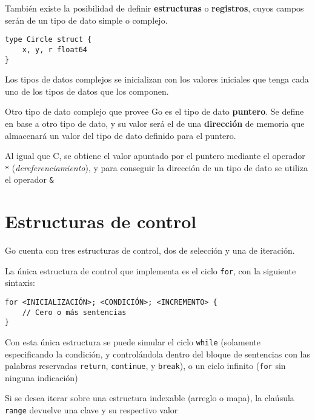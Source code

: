 También existe la posibilidad de definir \textbf{estructuras} o \textbf{registros}, cuyos campos serán de un tipo de dato simple o complejo.

\vspace*{5mm}
\begin{lstlisting}[title=Definición de un tipo de registro \texttt{Circle} con tres campos del mismo tipo]
type Circle struct {
    x, y, r float64
}
\end{lstlisting}

Los tipos de datos complejos se inicializan con los valores iniciales que tenga cada uno de los tipos de datos que los componen.

Otro tipo de dato complejo que provee Go es el tipo de dato \textbf{puntero}. Se define en base a otro tipo de dato, y su valor será el de una \textbf{dirección} de memoria que almacenará un valor del tipo de dato definido para el puntero. 

Al igual que C, se obtiene el valor apuntado por el puntero mediante el operador \texttt{*} (\emph{dereferenciamiento}), y para conseguir la dirección de un tipo de dato se utiliza el operador \texttt{\&} 



\section{Estructuras de control}

Go cuenta con tres estructuras de control, dos de selección y una de iteración.

La única estructura de control que implementa es el ciclo \texttt{for}, con la siguiente sintaxis:

\begin{lstlisting}[title=\centering Sintaxis del ciclo \texttt{for} (la llave debe estar en la misma línea que las sentencias de incremento)]
for <INICIALIZACIÓN>; <CONDICIÓN>; <INCREMENTO> {
    // Cero o más sentencias
} 
\end{lstlisting}

Con esta única estructura se puede simular el ciclo \texttt{while} (solamente especificando la condición, y controlándola dentro del bloque de sentencias con las palabras reservadas \texttt{return}, \texttt{continue}, y \texttt{break}), o un ciclo infinito (\texttt{for} sin ninguna indicación) 

Si se desea iterar sobre una estructura indexable (arreglo o mapa), la claúsula \texttt{range} devuelve una clave y su respectivo valor   

